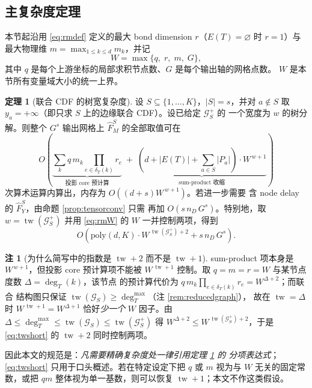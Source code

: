 \documentclass[a4paper,11pt]{article}
\theoremstyle{definition}
\newtheorem{theorem}{定理}
\newtheorem{remark}{注}
\newcommand{\1}{\mathbf 1}
\newcommand{\tw}{\operatorname{tw}}
\newcommand{\Gcal}{\mathcal G}
\begin{document}
\subsection{主复杂度定理}

本节起沿用 \eqref{eq:rmdef} 定义的最大 bond dimension $r$（$E(T)=\varnothing$
时 $r=1$）与最大物理维 $m=\max_{1\le k\le d}m_k$，并记
\begin{equation}
\label{eq:rmW}
W=\max\{q,\;r,\;m,\;G\},
\end{equation}
其中 $q$ 是每个上游坐标的局部求积节点数、$G$ 是每个输出轴的网格点数。
$W$ 是本节所有变量域大小的统一上界。

\begin{theorem}[联合 CDF 的树宽复杂度]
\label{thm:tw}
设 $S\subseteq\{1,\ldots,K\}$，$|S|=s$，并对 $a\notin S$ 取
$y_a=+\infty$（即只求 $S$ 上的边缘联合 CDF）。设已给定 $\Gcal_S^{+}$ 的
一个宽度为 $w$ 的树分解。则整个 $G^{s}$ 输出网格上
$\widehat F^{S}_{M}$ 的全部取值可在
\[
O\!\left(
\underbrace{\textstyle\sum_{k}q\,m_k\prod_{e\in\delta_T(k)}r_e}
_{\text{投影 core 预计算}}
\;+\;
\underbrace{(d+|E(T)|+\textstyle\sum_{a\in S}|P_a|)\cdot W^{\,w+1}}
_{\text{sum-product 收缩}}
\right)
\]
次算术运算内算出，内存为 $O\!\left((d+s)W^{\,w+1}\right)$。若进一步需要
含 node delay 的 $\widehat F^{S}_{Y}$，由命题 \ref{prop:tensorconv} 只需
再加 $O(s\,n_D\,G^{s})$。特别地，取
$w=\tw(\Gcal_S^{+})$ 并用 \eqref{eq:rmW} 的 $W$ 一并控制两项，得到
\begin{equation}
\label{eq:twshort}
O\!\left(
\mathrm{poly}(d,K)\cdot
W^{\,\tw(\Gcal_S^{+})+2}
+
s\,n_D\,G^{s}
\right).
\end{equation}
\end{theorem}

\begin{remark}[为什么简写中的指数是 $\tw+2$ 而不是 $\tw+1$]
\label{rem:twexp}
sum-product 项本身是 $W^{\,w+1}$，但投影 core 预计算项不能被
$W^{\,\tw+1}$ 控制。取 $q=m=r=W$ 与某节点度数 $\Delta=\deg_T(k)$，该节点
的预计算代价为 $q\,m_k\prod_{e\in\delta_T(k)}r_e=W^{\Delta+2}$；而联合
结构图只保证 $\tw(\Gcal_S)\ge\deg_T^{\max}$（注 \ref{rem:reducedgraph}），
故在 $\tw=\Delta$ 时 $W^{\,\tw+1}=W^{\Delta+1}$ 恰好\emph{少一个} $W$
因子。由 $\Delta\le\deg_T^{\max}\le\tw(\Gcal_S)\le\tw(\Gcal_S^{+})$ 得
$W^{\Delta+2}\le W^{\,\tw(\Gcal_S^{+})+2}$，于是 \eqref{eq:twshort} 的
$\tw+2$ 同时控制两项。

因此本文的规范是：\emph{凡需要精确复杂度处一律引用定理 \ref{thm:tw} 的
分项表达式}；\eqref{eq:twshort} 只用于口头概述。若在特定设定下把 $q$ 或
$m$ 视为与 $W$ 无关的固定常数，或把 $qm$ 整体视为单一基数，则可以恢复
$\tw+1$；本文不作这类假设。
\end{remark}
\end{document}
